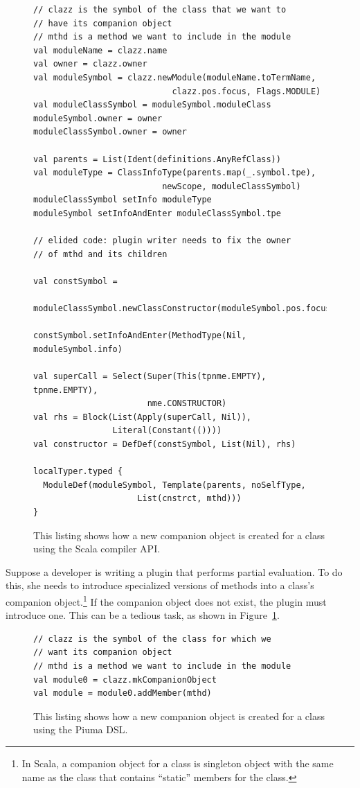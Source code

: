 \documentclass{article}
\begin{document}
\begin{figure}[tp]
\begin{lstlisting}
// clazz is the symbol of the class that we want to
// have its companion object
// mthd is a method we want to include in the module
val moduleName = clazz.name
val owner = clazz.owner
val moduleSymbol = clazz.newModule(moduleName.toTermName,
                            clazz.pos.focus, Flags.MODULE)
val moduleClassSymbol = moduleSymbol.moduleClass
moduleSymbol.owner = owner
moduleClassSymbol.owner = owner

val parents = List(Ident(definitions.AnyRefClass))
val moduleType = ClassInfoType(parents.map(_.symbol.tpe), 
                          newScope, moduleClassSymbol)
moduleClassSymbol setInfo moduleType
moduleSymbol setInfoAndEnter moduleClassSymbol.tpe

// elided code: plugin writer needs to fix the owner
// of mthd and its children

val constSymbol = 
  moduleClassSymbol.newClassConstructor(moduleSymbol.pos.focus)

constSymbol.setInfoAndEnter(MethodType(Nil, moduleSymbol.info)

val superCall = Select(Super(This(tpnme.EMPTY), tpnme.EMPTY),
                       nme.CONSTRUCTOR)
val rhs = Block(List(Apply(superCall, Nil)),
                Literal(Constant(())))
val constructor = DefDef(constSymbol, List(Nil), rhs)

localTyper.typed {
  ModuleDef(moduleSymbol, Template(parents, noSelfType,
                     List(cnstrct, mthd)))
}
\end{lstlisting}
\caption{This listing shows how a new companion object is created for a class
using the Scala compiler API.}
\label{lst:scala_introduceModule}
\end{figure}

Suppose a developer is writing a plugin that performs partial evaluation.  To
do this, she needs to introduce specialized versions of methods into a class's
companion object.\footnote{In Scala, a companion object for a class is
  singleton object with the same name as the class that contains ``static''
  members for the class.} If the companion object does not exist, the plugin
must introduce one.  This can be a tedious task, as shown in
Figure~\ref{lst:scala_introduceModule}.


\begin{figure}[tp]
\begin{lstlisting}
// clazz is the symbol of the class for which we
// want its companion object
// mthd is a method we want to include in the module
val module0 = clazz.mkCompanionObject
val module = module0.addMember(mthd)
\end{lstlisting}
\caption{This listing shows how a new companion object is created for a class
using the Piuma DSL.}
\label{lst:piuma_introduceModule}
\end{figure}
\end{document}
